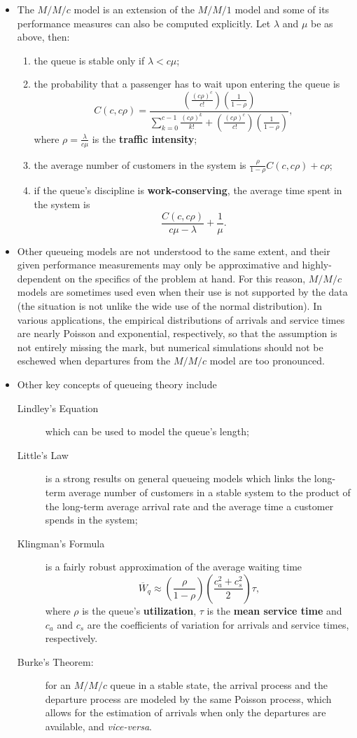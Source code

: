 \begin{itemize}[noitemsep]
\begin{enumerate}
\end{enumerate}
\item The $M/M/c$ model is an extension of the $M/M/1$ model and some of its performance measures can also be computed explicitly. Let $\lambda$ and $\mu$ be as above, then:
\begin{enumerate}
\item the queue is stable only if $\lambda<c\mu$;
\item the probability that a passenger has to wait upon entering the queue is $$C(c,c\rho)=\frac{\left( \frac{(c\rho)^c}{c!}\right) \left(
\frac{1}{1-\rho} \right)}{\sum_{k=0}^{c-1} \frac{(c\rho)^k}{k!} +
\left( \frac{(c\rho)^c}{c!} \right) \left( \frac{1}{1-\rho}
\right)},$$ where $\rho=\frac{\lambda}{c\mu}$ is the \textbf{traffic intensity};
\item the average number of customers in the system is $\frac{\rho}{1-\rho} C(c,c\rho) + c \rho$;
\item if the queue's discipline is \textbf{work-conserving}, the average time spent in the system is $$\frac{C(c,c\rho)}{c \mu - \lambda} + \frac{1}{\mu}.$$
\end{enumerate}
\item Other queueing models are not understood to the same extent, and their given performance measurements may only be approximative and highly-dependent on the specifics of the problem at hand. For this reason, $M/M/c$ models are sometimes used even when their use is not supported by the data (the situation is not unlike the wide use of the normal distribution). In various applications, the empirical distributions of arrivals and service times are nearly Poisson and exponential, respectively, so that the assumption is not entirely missing the mark, but numerical simulations should not be eschewed when departures from the $M/M/c$ model are too pronounced.    
\item Other key concepts of queueing theory include
\begin{description}
\item[Lindley's Equation] which can be used to model the queue's length;
\item[Little's Law] is a strong results on general queueing models which links the long-term average number of customers in a stable system to the product of the long-term average arrival rate and the average time a customer spends in the system;
\item[Klingman's Formula] is a fairly robust approximation of the average waiting time $$ \overline{W}_q \approx \left( \frac{\rho}{1-\rho} \right) \left( \frac{c_a^2+c_s^2}{2}\right) \tau,$$ where $\rho$ is the queue's \textbf{utilization},  $\tau$ is the \textbf{mean service time} and $c_a$ and $c_s$ are the coefficients of variation for arrivals and service times, respectively. 
\item[Burke's Theorem:] for an $M/M/c$ queue in a stable state, the arrival process and the departure process are modeled by the same Poisson process, which allows for the estimation of arrivals when only the departures are available, and \textit{vice-versa}.  
\end{description}

\end{itemize}
